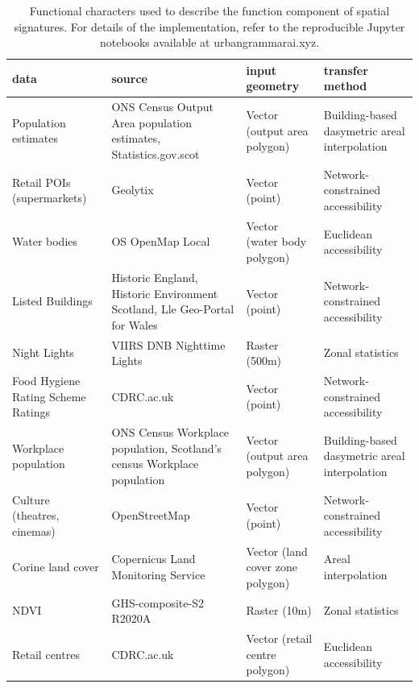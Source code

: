 \begin{table}
\begin{tabular}{p{35mm}p{50mm}p{35mm}p{40mm}}
\toprule
                                data & source &                   input geometry &                               transfer method \\
\midrule
                Population estimates & ONS Census Output Area population estimates, Statistics.gov.scot &     Vector (output area polygon) & Building-based dasymetric areal interpolation \\
          Retail POIs (supermarkets) & Geolytix &                   Vector (point) &             Network-constrained accessibility \\
                        Water bodies & OS OpenMap Local &      Vector (water body polygon) &                       Euclidean accessibility \\
                    Listed Buildings & Historic England, Historic Environment Scotland, Lle Geo-Portal for Wales &                   Vector (point) & Network-constrained accessibility \\
                        Night Lights & VIIRS DNB Nighttime Lights &                    Raster (500m) &                              Zonal statistics \\
  Food Hygiene Rating Scheme Ratings & CDRC.ac.uk &                   Vector (point) &             Network-constrained accessibility \\
                Workplace population & ONS Census Workplace population, Scotland's census Workplace population &     Vector (output area polygon) & Building-based dasymetric areal interpolation \\
         Culture (theatres, cinemas) & OpenStreetMap &                   Vector (point) &             Network-constrained accessibility \\
                   Corine land cover & Copernicus Land Monitoring Service & Vector (land cover zone polygon) &                           Areal interpolation \\
                                NDVI & GHS-composite-S2 R2020A &                     Raster (10m) &                              Zonal statistics \\
                      Retail centres & CDRC.ac.uk &   Vector (retail centre polygon) &                       Euclidean accessibility \\
\bottomrule
\end{tabular}

\caption{\label{tab:function}Functional characters used to
describe the function component of spatial signatures. For details of the implementation,
refer to the reproducible Jupyter notebooks available at urbangrammarai.xyz.}
\end{table}


